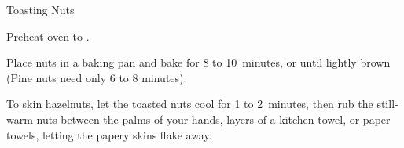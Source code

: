 \begin{recipe}{Toasting Nuts}{}{}

\begin{directions}
\item Preheat oven to .
\item Place nuts in a baking pan and bake for 8 to 10~minutes, or until lightly brown (Pine nuts need only 6 to 8 minutes).
\item To skin hazelnuts, let the toasted nuts cool for 1 to 2~minutes, then rub the still-warm nuts between the palms of your hands, layers of a kitchen towel, or paper towels, letting the papery skins flake away.
\end{directions}
\end{recipe}
